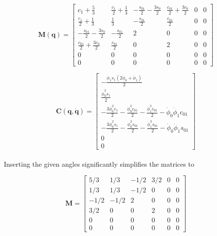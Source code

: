 \begin{equation}\label{eq:ex_inertia}
    \mathbf{M(q)} = 
    \begin{bmatrix}
        c_1+\frac{5}{3} & \frac{c_1}{2} + \frac{1}{3} & -\frac{s_{01}}{2} - \frac{3s_0}{2} & \frac{c_{01}}{2} + \frac{3c_0}{2} & 0 & 0 \\
        \frac{c_1}{2}+\frac{1}{3} & \frac{1}{3} & -\frac{s_{01}}{2} & \frac{c_{01}}{2} & 0 & 0 \\
        -\frac{s_{01}}{2}- \frac{3s_0}{2} & -\frac{s_{01}}{2} & 2 & 0 & 0 & 0 \\
        \frac{c_{01}}{2}+ \frac{3c_0}{2} & \frac{c_{01}}{2} & 0 & 2 & 0 & 0 \\
        0 & 0 & 0 & 0 & 0  & 0 \\
        0 & 0 & 0 & 0 & 0  & 0
    \end{bmatrix}
\end{equation}

\begin{equation}\label{eq:ex_coriolis}
    \mathbf{C(q, \dot{q})} = 
    \begin{bmatrix}
        -\frac{\dot{\phi}_1 s_1 (2\dot{\phi}_0+ \dot{\phi}_1)}{2} \\
        \frac{\dot{\phi}_0^2 s_1}{2} \\
        -\frac{3 \dot{\phi}_0^2 c_1}{2} - \frac{\dot{\phi}_0^2 c_{01}}{2} - \frac{\dot{\phi}_1^2 c_{01}}{2} - \dot{\phi}_0 \dot{\phi}_1 c_{01} \\
        -\frac{3 \dot{\phi}_0^2 s_1}{2} - \frac{\dot{\phi}_0^2 s_{01}}{2} - \frac{\dot{\phi}_1^2 s_{01}}{2} - \dot{\phi}_0 \dot{\phi}_1 s_{01} \\
        0 \\ 0
    \end{bmatrix}
\end{equation}
\\
Inserting the given angles significantly simplifies the matrices to

\begin{equation}
    \mathbf{M} = 
    \begin{bmatrix}
        5/3 & 1/3 & -1/2 & 3/2 & 0& 0 \\
        1/3 & 1/3 & -1/2 & 0 & 0 & 0\\
        -1/2 & -1/2 & 2 & 0 & 0 & 0\\
        3/2 & 0 & 0 & 2 & 0 & 0\\
        0 & 0 & 0 & 0 & 0 & 0\\
        0 & 0 & 0 & 0 & 0 & 0
    \end{bmatrix}
\end{equation}

